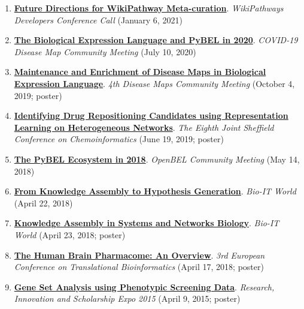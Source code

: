 \documentclass[10pt,a4paper,sans]{moderncv} %
\begin{document}
\begin{enumerate}
    \item \textbf{\href{https://docs.google.com/presentation/d/1C8T3XVOL8GiZ68WBXXSnI3SVjhd2aSBuVLXVPPGqKTw/edit?usp=sharing}{Future Directions for WikiPathway Meta-curation}}. \textit{WikiPathways Developers Conference Call} (January 6, 2021)

    \item \textbf{\href{https://docs.google.com/presentation/d/18ntRMvO3Q9KTX87xoLOIgqAW3iiUvxJsfEmaFh1-52A/edit?usp=sharing}{The Biological Expression Language and PyBEL in 2020}}. \textit{COVID-19 Disease Map Community Meeting} (July 10, 2020)

    \item \textbf{\href{https://doi.org/10.6084/m9.figshare.9917753.v3}{Maintenance and Enrichment of Disease Maps in Biological Expression Language}}. \textit{4th Disease Maps Community Meeting} (October 4, 2019; poster)

    \item \textbf{\href{https://doi.org/10.6084/m9.figshare.8288822.v2}{Identifying Drug Repositioning Candidates using Representation Learning on Heterogeneous Networks}}. \textit{The Eighth Joint Sheffield Conference on Chemoinformatics} (June 19, 2019; poster)

    \item \textbf{\href{https://docs.google.com/presentation/d/1Gsk8LxrVgrICproSgWZ3Gk4BXyOg-UwFlfzhVw5O0t8/edit?usp=sharing}{The PyBEL Ecosystem in 2018}}. \textit{OpenBEL Community Meeting} (May 14, 2018)

    \item \textbf{\href{https://docs.google.com/presentation/d/1_3j8H4f9pQ1m2ZQrF2QNfQNLh5SGqaodnl4AlaAST6w/edit?usp=sharing}{From Knowledge Assembly to Hypothesis Generation}}. \textit{Bio-IT World} (April 22, 2018)

    \item \textbf{\href{https://doi.org/10.6084/m9.figshare.6231701.v1}{Knowledge Assembly in Systems and Networks Biology}}. \textit{Bio-IT World} (April 23, 2018; poster)

    \item \textbf{\href{https://doi.org/10.6084/m9.figshare.6163775.v3}{The Human Brain Pharmacome: An Overview}}. \textit{3rd European Conference on Translational Bioinformatics} (April 17, 2018; poster)

    \item \textbf{\href{https://docs.google.com/presentation/d/1FU8lWGw6x4y9A_qB9rmxSaRRKiC0V3403EJETVGYMzk/edit?usp=sharing}{Gene Set Analysis using Phenotypic Screening Data}}. \textit{Research, Innovation and Scholarship Expo 2015} (April 9, 2015; poster)

\end{enumerate}
\end{document}
